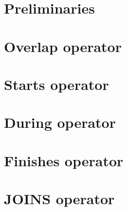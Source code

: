 \documentclass[a4paper,UKenglish]{lipics-v2021}
\begin{document}
	
	\maketitle
	
	
	
%	
%	
	
	\section{Preliminaries}\label{sec:preliminaries}
	
	
	
	
	\section{Overlap operator}\label{sec:overlap}
	
	
	\section{Starts operator}\label{sec:starts}
	
	
	\section{During operator}\label{sec:during}
	
	
	\section{Finishes operator}\label{sec:finishes}
	
	
	\section{JOINS operator}\label{sec:joins}
	
	
	
%	
%	
	
%	
%	
	
%	
%	
%	
%	
%	
%	
	
\end{document}
